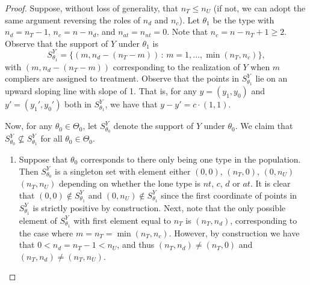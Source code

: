 \documentclass[12pt,reqno]{amsart}
\theoremstyle{theorem}
\theoremstyle{definition}
\newcommand{\0}{\mathbf{0}}
\newcommand{\1}{\mathbf{1}}
\begin{document}
\begin{proof}
Suppose, without loss of generality, that $n_T \leq n_U$ (if not, we can adopt the same argument reversing the roles of $n_d$ and $n_c$). Let $\theta_1$ be the type with $n_d = n_T - 1$, $n_c = n-n_d $, and $n_{at}=n_{nt} = 0$. Note that $n_c = n-n_T +1 \geq 2$. Observe that the support of $Y$ under $\theta_1$ is $$S_{\theta_1}^Y = \{ (m,n_d-(n_T-m)) \,:\, m=1,..., \min(n_T, n_c) \},$$ with $(m,n_d-(n_T-m))$ corresponding to the realization of $Y$ when $m$ compliers are assigned to treatment. Observe that the points in $S_{\theta_1}^Y$ lie on an upward sloping line with slope of 1. That is, for any $y= (y_1,y_0)$ and $y' =(y_1',y_0')$ both in $S^Y_{\theta_1}$, we have that $y-y' = c \cdot (1,1)$. 

Now, for any $\theta_0 \in \Theta_0$, let $S^Y_{\theta_0}$ denote the support of $Y$ under $\theta_0$. We claim that $S^Y_{\theta_0} \not\subseteq S^Y_{\theta_1}$ for all
$\theta_0 \in \Theta_0$. 

\begin{enumerate}
    \item [Case 1] Suppose that $\theta_0$ corresponds to there only being
one type in the population. Then $S_{\theta_0}^Y$ is a singleton set with element either $
(0,0)$, $(n_T,0)$, $(0,n_U)$ $(n_T,n_U)$ depending on whether the lone type is $nt$, $c$, $d$ or $at$. It is
clear that $(0,0) \not\in S_{\theta_1}^Y$ and $(0,n_U) \not\in S_{\theta_1}^Y$ since the first coordinate of points in $S_{\theta_1}^Y$ is strictly positive by construction. Next, note that the only possible element of
$S_{\theta_1}^Y$ with first element equal to $n_T$ is $(n_T,n_d)$, corresponding to the
case where $m = n_T = \min(n_T,n_c)$. However, by construction we have that $0 < n_d =
n_T - 1 < n_U$, and thus $(n_T,n_d) \neq (n_T,0)$ and $(n_T,n_d) \neq (n_T,n_U)$.






\end{enumerate}
\end{proof}
\end{document}
